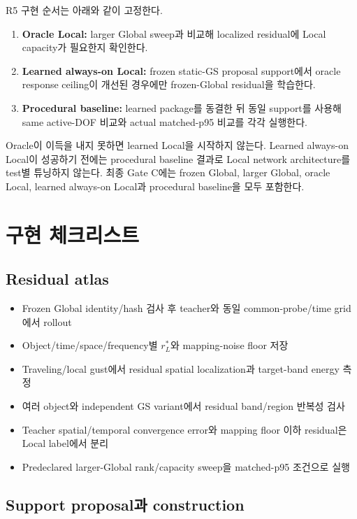\documentclass[10pt,a4paper]{article}
\begin{document}
R5 구현 순서는 아래와 같이 고정한다.

\begin{enumerate}
  \item \textbf{Oracle Local:} larger Global sweep과 비교해 localized residual에 Local capacity가 필요한지 확인한다.
  \item \textbf{Learned always-on Local:} frozen static-GS proposal support에서 oracle response ceiling이
  개선된 경우에만 frozen-Global residual을 학습한다.
  \item \textbf{Procedural baseline:} learned package를 동결한 뒤 동일 support를 사용해
  same active-DOF 비교와 actual matched-p95 비교를 각각 실행한다.
\end{enumerate}

Oracle이 이득을 내지 못하면 learned Local을 시작하지 않는다. Learned always-on Local이 성공하기 전에는
procedural baseline 결과로 Local network architecture를 test별 튜닝하지 않는다. 최종 Gate C에는
frozen Global, larger Global, oracle Local, learned always-on Local과 procedural baseline을 모두 포함한다.

\section{구현 체크리스트}
\label{sec:r5-chapter-4}

\subsection{Residual atlas}

\begin{itemize}
  \item[$\square$] Frozen Global identity/hash 검사 후 teacher와 동일 common-probe/time grid에서 rollout
  \item[$\square$] Object/time/space/frequency별 \(r_L^*\)와 mapping-noise floor 저장
  \item[$\square$] Traveling/local gust에서 residual spatial localization과 target-band energy 측정
  \item[$\square$] 여러 object와 independent GS variant에서 residual band/region 반복성 검사
  \item[$\square$] Teacher spatial/temporal convergence error와 mapping floor 이하 residual은 Local label에서 분리
  \item[$\square$] Predeclared larger-Global rank/capacity sweep을 matched-p95 조건으로 실행
\end{itemize}

\subsection{Support proposal과 construction}
\end{document}
